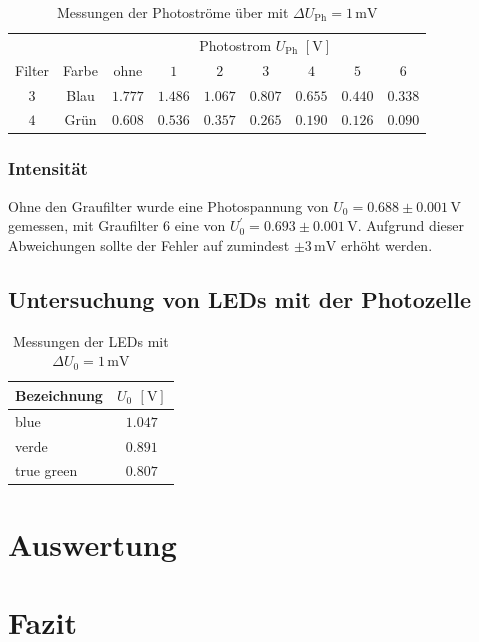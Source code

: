 \documentclass[12pt,a4paper]{scrartcl}
\numberwithin{equation}{section} %
\begin{document}
\begin{table}[h!]
	\centering
	\begin{tabular}{c|c|c|c|c|c|c|c|c}
		 	&& \multicolumn{7}{c}{Photostrom $U_\mathrm{Ph}$ $[\mathrm{V}]$} \\
		Filter & Farbe & ohne & $1$ & $2$ & $3$ & $4$ & $5$ & $6$ \\
		\hline
		$3$ & Blau & $1.777$ & $1.486$ & $1.067$ & $0.807$ & $0.655$ & $0.440$ & $0.338$ \\
		$4$ & Grün & $0.608$ & $0.536$ & $0.357$ & $0.265$ & $0.190$ & $0.126$ & $0.090$
	\end{tabular}
	\caption{Messungen der Photoströme über mit $\Delta U_\mathrm{Ph}=1\mathrm{\,mV}$}
	\label{tab:Photostrom}
\end{table}

\subsubsection{Intensität}
Ohne den Graufilter wurde eine Photospannung von $U_0=0.688\pm0.001\mathrm{\,V}$ gemessen, mit Graufilter $6$ eine von $U_0^\prime=0.693\pm0.001\mathrm{\,V}$. Aufgrund dieser Abweichungen sollte der Fehler auf zumindest $\pm 3\mathrm{\,mV}$ erhöht werden.

\subsection{Untersuchung von LEDs mit der Photozelle}
\begin{table}[h!]
	\centering
	\begin{tabular}{l|c}
		Bezeichnung & $U_0$ $[\mathrm{V}]$ \\
		\hline
		blue & $1.047$ \\
		verde & $0.891$ \\
		true green & $0.807$ \\
	\end{tabular}
	\caption{Messungen der LEDs mit $\Delta U_0=1\mathrm{\,mV}$}
	\label{tab:LEDs}
\end{table}


\clearpage
\hypertarget{auswertung}{%
\section{Auswertung}\label{auswertung}}

\clearpage
\hypertarget{fazit}{%
\section{Fazit}\label{fazit}}
\end{document}
